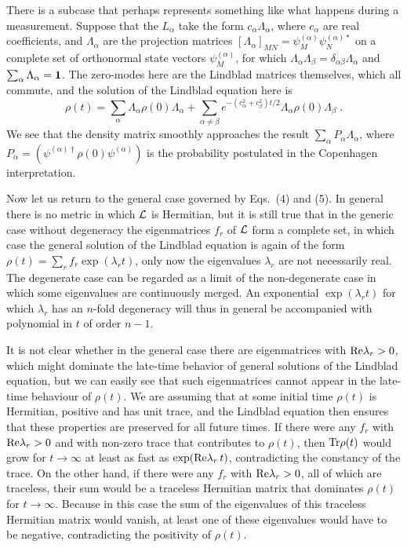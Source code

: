 There is a subcase  that perhaps represents something like what happens during a measurement.  Suppose that the $L_\alpha$ take the form $c_\alpha \Lambda_\alpha$, where $c_\alpha$ are  real coefficients, and $\Lambda_\alpha$ are the  projection matrices $[\Lambda_\alpha]_{MN}=\psi^{(\alpha)}_M \psi^{(\alpha)*}_N$ on a complete set of orthonormal state vectors $\psi^{(\alpha)}_M$, for which $\Lambda_\alpha\Lambda_\beta=\delta_{\alpha\beta}\Lambda_\alpha$ and $\sum_\alpha\Lambda_\alpha=\mbox{\boldmath{$1$}}$.    
The zero-modes here are the Lindblad matrices themselves, which all commute, and the solution of the Lindblad equation here is
\begin{equation}
\rho(t)=\sum_\alpha \Lambda_\alpha\rho(0)\Lambda_\alpha+\sum_{\alpha\neq \beta}e^{-(c^2_\alpha+c^2_\beta)t/2}\Lambda_\alpha\rho(0)\Lambda_\beta\;.
\end{equation}
We see that the density matrix smoothly approaches the result $\sum_\alpha P_\alpha\Lambda_\alpha$, where $P_\alpha=(\psi^{(\alpha)\dagger}\rho(0)\psi^{(\alpha)})$ is the probability postulated in the Copenhagen interpretation.  

Now let us return to the general case governed by Eqs.~(4) and (5).  In general there is no metric in which ${\cal L}$ is Hermitian, but it is still true that in the generic case without degeneracy the eigenmatrices $f_r$ of ${\cal L}$ form a complete set, in which case the general solution of the Lindblad equation is again of the form $\rho(t)=\sum_r f_r\exp(\lambda_r t)$, only now the eigenvalues $\lambda_r$ are not necessarily real.  The degenerate case can be regarded as a limit of the non-degenerate case in which some eigenvalues are continuously merged.  An exponential $\exp(\lambda_r t)$ for which $\lambda_r$ has an $n$-fold degeneracy will thus in general be accompanied with polynomial in $t$ of order $n-1$.

It is not clear whether in the general case  there are  eigenmatrices with ${\rm Re}\lambda_r>0$, which might dominate the late-time behavior of general solutions of the Lindblad equation, but we can easily see that such eigenmatrices cannot appear in the late-time behaviour of $\rho(t)$.  We are assuming that at some initial time $\rho(t)$ is Hermitian, positive and has unit trace, and the Lindblad equation then ensures that these properties are preserved for all future times.  If there were any $f_r$ with ${\rm Re}\lambda_r>0$ and with non-zero trace that contributes to $\rho(t)$, then ${\rm Tr}\rho(t)$ would grow for $t\rightarrow\infty$  at least as fast as $\exp({\rm Re}\lambda_r\,t)$, contradicting the constancy of the trace.  On the other hand, if there were any $f_r$ with ${\rm Re}\lambda_r>0$, all of which are traceless, their sum would be a traceless Hermitian matrix that dominates $ \rho(t)$ for $t\rightarrow\infty$.  Because  in this case the sum of the eigenvalues of this traceless Hermitian matrix would vanish, at least one of these eigenvalues would have to be negative,  contradicting the positivity of $\rho(t)$.

